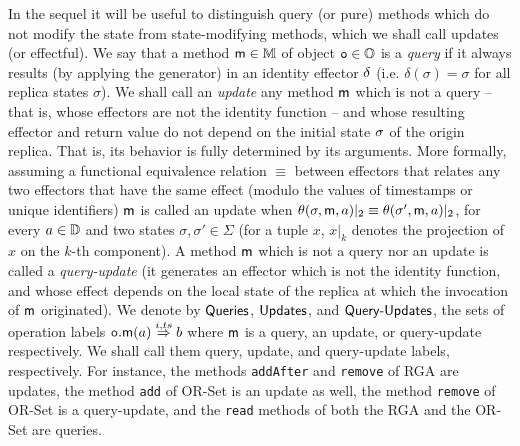 In the sequel it will be useful to distinguish query (or pure) methods
which do not modify the state from state-modifying methods, which we
shall call updates (or effectful).
%
We say that a method $\mathsf{m}\in\mathbb{M}$ of object $\mathtt{o}\in \mathbb{O}$
is a \emph{query} if it always results (by applying the generator) in an identity effector $\delta$ (i.e.
$\delta(\sigma)=\sigma$ for all replica states
$\sigma$).
We shall call an \emph{update} any method $\mathsf{m}$ which is not a
query -- that is, whose effectors are not the identity function -- and
whose resulting effector and return value do not depend on the
initial state $\sigma$ of the origin replica.
That is, its behavior is fully determined by its arguments.
More formally, assuming a functional equivalence relation $\equiv$
between effectors that relates any two effectors that have the same
effect (modulo the values of timestamps or unique identifiers)
$\mathsf{m}$ is called an update when
$\theta(\sigma,\mathsf{m},a)|_2 \equiv
\theta(\sigma',\mathsf{m},a)|_2$, for every $a\in\mathbb{D}$
and two states $\sigma,\sigma'\in\Sigma$ (for a tuple $x$, $x|_k$
denotes the projection of $x$ on the $k$-th component).
A method $\mathsf{m}$ which is not a query nor an update is called a
\emph{query-update} (it generates an effector which is not the
identity function, and whose effect depends on the local state of the
replica at which the invocation of $\mathsf{m}$ originated).
We denote by $\mathsf{Queries}$, $\mathsf{Updates}$, and $\mathsf{Query\text{-}Updates}$, the sets of
operation labels ${{\mathtt{o}.\mathsf{m}}}(a) \overset{i,ts}{\Rightarrow} b$ where $\mathsf{m}$
is a query, an update, or query-update respectively.
We shall call them query, update, and query-update labels,
respectively. For instance, the methods \lstinline|addAfter| and
\lstinline|remove| of RGA are updates, the method \lstinline|add| of OR-Set is an update as well,
the method \lstinline|remove| of OR-Set is a query-update, and the \lstinline|read| methods of both the RGA and the OR-Set
are queries.

